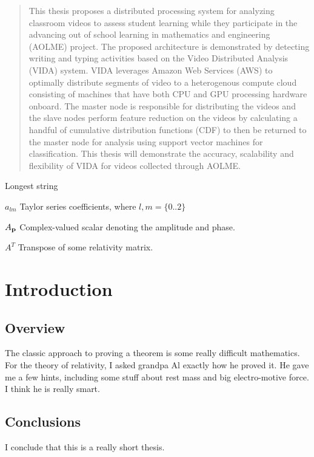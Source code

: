 \documentclass[botnum, fleqn]{unmeethesis}
\begin{document}
  \begin{abstract}
    This thesis proposes a distributed processing system for analyzing classroom
    videos to assess student learning while they participate in the advancing
    out of school learning in mathematics and engineering (AOLME) project. The
    proposed architecture is demonstrated by detecting writing and typing
    activities based on the Video Distributed Analysis (VIDA) system. VIDA
    leverages Amazon Web Services (AWS) to optimally distribute segments of
    video to a heterogenous compute cloud consisting of machines that have both
    CPU and GPU processing hardware onboard. The master node is responsible for
    distributing the videos and the slave nodes perform feature reduction on the
    videos by calculating a handful of cumulative distribution functions (CDF)
    to then be returned to the master node for analysis using support vector
    machines for classification. This thesis will  demonstrate the accuracy,
    scalability and flexibility of VIDA for videos collected through AOLME.

    \clearpage %
  \end{abstract}

  \tableofcontents
  \listoffigures
  \listoftables

  \begin{glossary}{Longest  string}
    \item[$a_{lm}$]
    Taylor series coefficients, where $l,m = \{0..2\}$
    \item[$A_{\bf{p}}$]
    Complex-valued scalar denoting the amplitude and phase.
    \item[$A^T$]
    Transpose of some relativity matrix.
  \end{glossary}

  \mainmatter

  \chapter{Introduction}
  \section{\label{section:overview}Overview}
  The classic approach to proving a theorem is some really difficult
  mathematics.  For the theory of relativity, I asked grandpa Al exactly
  how he proved it.  He gave me a few hints, including some stuff about
  rest mass and big electro-motive force.  I think he is really smart.
  \section{Conclusions}
  I conclude that this is a really short thesis.
\end{document}
